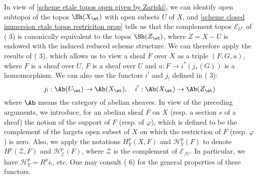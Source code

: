In view of \cref{scheme etale topos open given by Zariski}, we can identify open subtopoi of the topos $\Sh(X_\et)$ with open subsets $U$ of $X$, and \cref{scheme closed immersion etale topos restriciton prop} tells us that the complement topos $\mathcal{E}_{U^c}$ of (\cite{SGA4-1}  3) is canonically equivalent to the topos $\Sh(Z_\et)$, where $Z=X-U$ is endowed with the induced reduced scheme structure. We can therefore apply the results of (\cite{SGA4-1}  3), which allows us to view a sheaf $F$ over $X$ as a triple $(F,G,u)$, where $F$ is a sheaf over $U$, $F$ is a sheaf over $U$ and $u:F\to i^*(j_*(G))$ is a homomorphism. We can also use the functors $i^!$ and $j_!$ defined in (\cite{SGA4-1}  3):
\[j_!:\Ab(U_\et)\to \Ab(X_\et),\quad i^!:\Ab(X_\et)\to \Ab(Z_\et)\]
where $\Ab$ means the category of abelian sheaves. In view of the preceding arguments, we introduce, for an abelian sheaf $F$ on $X$ (resp. a section $s$ of a sheaf) the notion of the support of $F$ (resp. of $\varphi$), which is defined to be the complement of the largets open subset of $X$ on which the restriction of $F$ (resp. $\varphi$) is zero. Also, we apply the notations $H_Y^p(X,F)$ and $\mathcal{H}^p_Y(F)$ to denote $H^p(\mathcal{Z},F)$ and $\mathcal{H}^p_{\mathcal{Z}}(F)$, where $\mathcal{Z}$ is the complement of $\mathcal{E}_{/U}$. In particular, we have $\mathcal{H}^p_Y=R^pi_!$, etc. One may consult (\cite{SGA4-1}  6) for the general properties of these functors.

